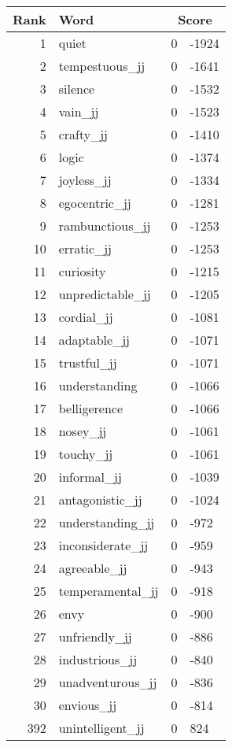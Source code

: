 \begin{longtable}[!htbp]{| rlr@{.}l |}
    \hline
    \textbf{Rank} & \textbf{Word} & \multicolumn{2}{c|}{\textbf{Score}} \\
    \hline
    \endhead
    1 & quiet & 0 & -1924 \\
    2 & tempestuous\_jj & 0 & -1641 \\
    3 & silence & 0 & -1532 \\
    4 & vain\_jj & 0 & -1523 \\
    5 & crafty\_jj & 0 & -1410 \\
    6 & logic & 0 & -1374 \\
    7 & joyless\_jj & 0 & -1334 \\
    8 & egocentric\_jj & 0 & -1281 \\
    9 & rambunctious\_jj & 0 & -1253 \\
    10 & erratic\_jj & 0 & -1253 \\
    11 & curiosity & 0 & -1215 \\
    12 & unpredictable\_jj & 0 & -1205 \\
    13 & cordial\_jj & 0 & -1081 \\
    14 & adaptable\_jj & 0 & -1071 \\
    15 & trustful\_jj & 0 & -1071 \\
    16 & understanding & 0 & -1066 \\
    17 & belligerence & 0 & -1066 \\
    18 & nosey\_jj & 0 & -1061 \\
    19 & touchy\_jj & 0 & -1061 \\
    20 & informal\_jj & 0 & -1039 \\
    21 & antagonistic\_jj & 0 & -1024 \\
    22 & understanding\_jj & 0 & -972 \\
    23 & inconsiderate\_jj & 0 & -959 \\
    24 & agreeable\_jj & 0 & -943 \\
    25 & temperamental\_jj & 0 & -918 \\
    26 & envy & 0 & -900 \\
    27 & unfriendly\_jj & 0 & -886 \\
    28 & industrious\_jj & 0 & -840 \\
    29 & unadventurous\_jj & 0 & -836 \\
    30 & envious\_jj & 0 & -814 \\
    392 & unintelligent\_jj & 0 & 824 \\

\end{longtable}
